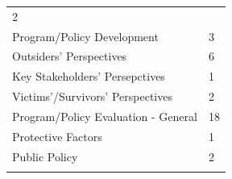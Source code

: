 \documentclass[]{tufte-handout}
\begin{document}
\begin{longtable}[]{@{}ll@{}}
\begin{minipage}[t]{0.21\columnwidth}
2\strut
\end{minipage}\tabularnewline
\begin{minipage}[t]{0.50\columnwidth}\raggedright\strut
Program/Policy Development\strut
\end{minipage} & \begin{minipage}[t]{0.21\columnwidth}\raggedright\strut
3\strut
\end{minipage}\tabularnewline
\begin{minipage}[t]{0.50\columnwidth}\raggedright\strut
Outsiders' Perspectives\strut
\end{minipage} & \begin{minipage}[t]{0.21\columnwidth}\raggedright\strut
6\strut
\end{minipage}\tabularnewline
\begin{minipage}[t]{0.50\columnwidth}\raggedright\strut
Key Stakeholders' Persepctives\strut
\end{minipage} & \begin{minipage}[t]{0.21\columnwidth}\raggedright\strut
1\strut
\end{minipage}\tabularnewline
\begin{minipage}[t]{0.50\columnwidth}\raggedright\strut
Victims'/Survivors' Perspectives\strut
\end{minipage} & \begin{minipage}[t]{0.21\columnwidth}\raggedright\strut
2\strut
\end{minipage}\tabularnewline
\begin{minipage}[t]{0.50\columnwidth}\raggedright\strut
Program/Policy Evaluation - General\strut
\end{minipage} & \begin{minipage}[t]{0.21\columnwidth}\raggedright\strut
18\strut
\end{minipage}\tabularnewline
\begin{minipage}[t]{0.50\columnwidth}\raggedright\strut
Protective Factors\strut
\end{minipage} & \begin{minipage}[t]{0.21\columnwidth}\raggedright\strut
1\strut
\end{minipage}\tabularnewline
\begin{minipage}[t]{0.50\columnwidth}\raggedright\strut
Public Policy\strut
\end{minipage} & \begin{minipage}[t]{0.21\columnwidth}\raggedright\strut
2\strut
\end{minipage}\tabularnewline
\begin{minipage}[t]{0.50\columnwidth}\raggedright\strut

\end{minipage}
\end{longtable}
\end{document}
